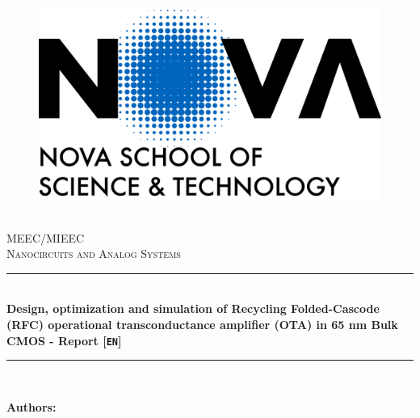 \documentclass[12pt]{article}
\newcommand{\HRule}{\rule{\linewidth}{0.5mm}} %
\begin{document}

\begin{center}
    \begin{figure}
        \vspace{-1.0cm}
        \includegraphics[scale = 0.055, left]{Images/NovaFctVer.png} %
        
    \end{figure}

    \mbox{}\\[2.0cm]
    \textsc{\Huge MEEC/MIEEC}\\[2.5cm]
    \textsc{\LARGE Nanocircuits and Analog Systems}\\[2.0cm]
    \HRule\\[0.4cm]
    {\large \bf { Design, optimization and simulation of Recycling Folded-Cascode (RFC) operational
    transconductance amplifier (OTA) in 65 nm Bulk CMOS - Report} [\texttt{EN}]}\\[0.2cm]
    \HRule\\[1.5cm]
\end{center}

\begin{flushleft}
    \textbf{Authors:}
\end{flushleft}
\end{document}
